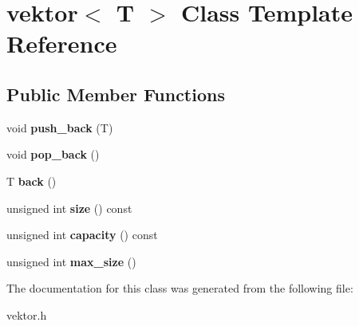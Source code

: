\hypertarget{classvektor}{}\section{vektor$<$ T $>$ Class Template Reference}
\label{classvektor}
\subsection*{Public Member Functions}
\begin{DoxyCompactItemize}
\item 
\mbox{\label{classvektor_a48b019b374e34f0564a7e633e8101a4b}} 
void {\bfseries push\+\_\+back} (T)
\item 
\mbox{\label{classvektor_a255c851e5cf36a8294a4af46fe00a557}} 
void {\bfseries pop\+\_\+back} ()
\item 
\mbox{\label{classvektor_a2d2408bde17172003073d7dd09f648b1}} 
T {\bfseries back} ()
\item 
\mbox{\label{classvektor_a14149c4ea0c8ff6b91b33051a54383ec}} 
unsigned int {\bfseries size} () const
\item 
\mbox{\label{classvektor_a11fc9183c5559bc73254619b0b4e7250}} 
unsigned int {\bfseries capacity} () const
\item 
\mbox{\label{classvektor_a48933a1407146e0f20ada2b072bd5c25}} 
unsigned int {\bfseries max\+\_\+size} ()
\end{DoxyCompactItemize}


The documentation for this class was generated from the following file\+:\begin{DoxyCompactItemize}
\item 
vektor.\+h\end{DoxyCompactItemize}
